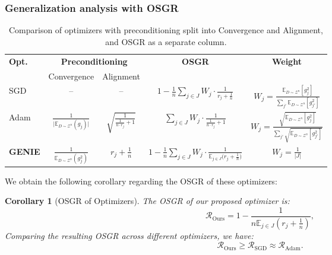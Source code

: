 \documentclass{article}
\theoremstyle{plain}
\newtheorem{corollary}[theorem]{Corollary}
\theoremstyle{definition}
\theoremstyle{remark}
\begin{document}
\subsubsection{Generalization analysis with OSGR}
\label{method: Generalization analysis}
\begin{table}[t]
\caption{Comparison of optimizers with preconditioning split into Convergence and Alignment, and OSGR as a separate column. }
\label{tab:analysis_opt_updated}
\vskip 0.15in
\begin{center}
\begin{small}
\begin{sc}
\begin{tabular}{lcccc}
\toprule
\textbf{Opt.} & \multicolumn{2}{c}{\textbf{Preconditioning}} & \textbf{OSGR} & \textbf{Weight}\\
\cmidrule(lr){2-3}& Convergence & Alignment & \\
\midrule
SGD 
&--&--&\(\displaystyle 1 - \frac{1}{n}\sum_{j \in J}\!W_{j}\cdot\frac{1}{ r_j + \frac{1}{n}}\)&\(\displaystyle W_{j} = \frac{\mathbb{E}_{D\sim\mathcal{Z}^n}[g_j^2]}{\sum_{j' }\mathbb{E}_{D\sim\mathcal{Z}^n}[g_{j'}^2]}\)\\
\addlinespace[1.5ex]
Adam 
& \(\displaystyle \frac{1}{\bigl|\mathbb{E}_{D \sim \mathcal{Z}^n}(g_j)\bigr|}\)&\(\displaystyle \sqrt{\frac{1}{\tfrac{1}{n \cdot r_j} + 1}}\)&\(\displaystyle \sum_{j \in J}\!W_{j}\cdot \frac{1}{\tfrac{1}{n \cdot r_j} + 1}\)&\(\displaystyle W_{j} = \frac{\sqrt{\mathbb{E}_{D\sim\mathcal{Z}^n}[g_j^2]}}{\sum_{j' }\sqrt{\mathbb{E}_{D\sim\mathcal{Z}^n}[g_{j'}^2]}}\)\\
\addlinespace[1.5ex]
\textbf{GENIE}&\(\displaystyle \frac{1}{\mathbb{E}_{D \sim \mathcal{Z}^n}(g_j^2)}\)&\(\displaystyle r_j + \frac{1}{n}\)&\(\displaystyle 1 - \frac{1}{n}\sum_{j \in J}\! W_{j}\cdot \frac{1}{\mathbb{E}_{j \in J}\!\bigl( r_j + \frac{1}{n}\bigr)}\) &\(\displaystyle W_{j} = \frac{1}{|J|}\)\\
\bottomrule
\end{tabular}
\end{sc}
\end{small}
\end{center}
\vskip -0.1in
\end{table}
We obtain the following corollary regarding the OSGR of these optimizers:
\begin{corollary}[OSGR of Optimizers]\label{cor:osgrcmp}
The OSGR of our proposed optimizer is:
\begin{equation}
\mathcal{R}_{\text{Ours}}=1 - \frac{1}{n \mathbb{E}_{j \in J} \left( r_{j}+ \frac{1}{n}\right)},
\end{equation}
Comparing the resulting OSGR across different optimizers,
we have: \begin{equation}
\mathcal{R}_{\text{Ours}} \geq \mathcal{R}_{\text{SGD}}  \approx \mathcal{R}_{\text{Adam}}.
\end{equation}
\end{corollary}
\end{document}
